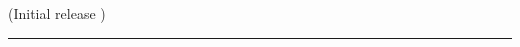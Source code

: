 \begin{release}
  \begin{relist}
    \item (Initial release )
  \end{relist}
\end{release}


\rule{\hsize}{2mm}

\newpage
